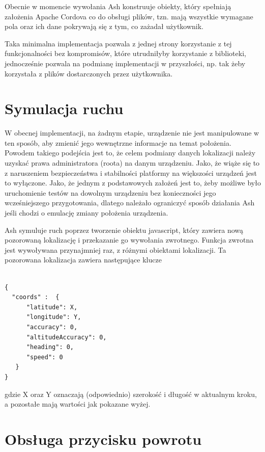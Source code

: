 \documentclass[brudnopis]{xmgr}
\begin{document}
Obecnie w momencie wywołania Ash konstruuje obiekty, który spełniają założenia Apache Cordova co do obsługi plików, tzn. mają wszystkie wymagane pola oraz ich dane pokrywają się z tym, co zażadał użytkownik. 

Taka minimalna implementacja pozwala z jednej strony korzystanie z tej funkcjonalności bez kompromisów, które utrudniłyby korzystanie z biblioteki, jednocześnie pozwala na podmianę implementacji w przyszłości, np. tak żeby korzystała z plików dostarczonych przez użytkownika.

\section{Symulacja ruchu}

W obecnej implementacji, na żadnym etapie, urządzenie nie jest manipulowane w ten sposób, aby zmienić jego wewnętrzne informacje na temat położenia. Powodem takiego podejścia jest to, że celem podmiany danych lokalizacji należy uzyskać prawa administratora (roota) na danym urządzeniu. Jako, że wiąże się to z naruszeniem bezpieczeństwa i stabilności platformy na większości urządzeń jest to wyłączone. Jako, że jednym z podstawowych założeń jest to, żeby możliwe było uruchomienie testów na dowolnym urządzeniu bez konieczności jego wcześniejszego przygotowania, dlatego należało ograniczyć sposób działania Ash jeśli chodzi o emulację zmiany położenia urządzenia. 

Ash symuluje ruch poprzez tworzenie obiektu javascript, który zawiera nową pozorowaną lokalizację i przekazanie go wywołania zwrotnego. Funkcja zwrotna jest wywoływana przynajmniej raz, z różnymi obiektami lokalizacji. Ta pozorowana lokalizacja zawiera następujące klucze

\begin{lstlisting}

{
  "coords" :  {
      "latitude": X, 
      "longitude": Y,
      "accuracy": 0, 
      "altitudeAccuracy": 0, 
      "heading": 0, 
      "speed": 0
   }
}

\end{lstlisting}

gdzie X oraz Y oznaczają (odpowiednio) szerokość i długość w aktualnym kroku, a pozostałe mają wartości jak pokazane wyżej.   

\section{Obsługa przycisku powrotu}
\end{document}
